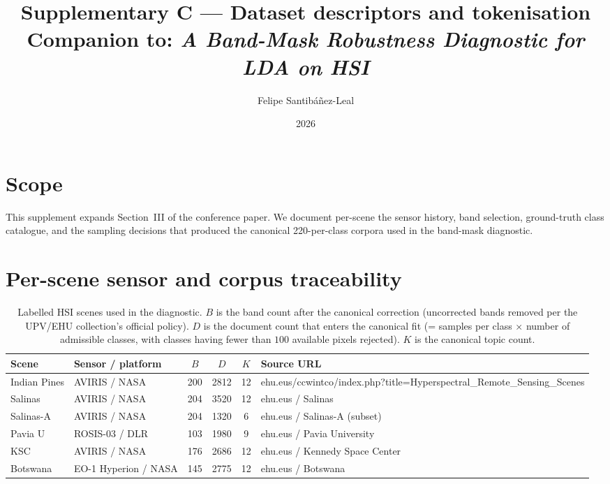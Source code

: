 \documentclass[11pt,a4paper]{article}
\title{Supplementary C --- Dataset descriptors and tokenisation\\
{\large Companion to: \emph{A Band-Mask Robustness Diagnostic for LDA on HSI}}}
\author{Felipe Santib\'a\~nez-Leal}
\date{2026}
\begin{document}
\maketitle

\section{Scope}
This supplement expands Section~III of the conference paper. We
document per-scene the sensor history, band selection, ground-truth
class catalogue, and the sampling decisions that produced the
canonical 220-per-class corpora used in the band-mask diagnostic.

\section{Per-scene sensor and corpus traceability}

\begin{longtable}{l p{2.6cm} c c c p{4.0cm}}
\caption{Labelled HSI scenes used in the diagnostic. $B$ is the band
count after the canonical correction (uncorrected bands removed per
the UPV/EHU collection's official policy). $D$ is the document count
that enters the canonical fit (= samples per class × number of
admissible classes, with classes having fewer than $100$ available
pixels rejected). $K$ is the canonical topic count.}
\label{tab:scenes-full}\\
\toprule
Scene & Sensor / platform & $B$ & $D$ & $K$ & Source URL  \\
\midrule
Indian Pines       & AVIRIS / NASA      & 200 & 2812 & 12 & ehu.eus/ccwintco/index.php?title=Hyperspectral\_Remote\_Sensing\_Scenes \\
Salinas            & AVIRIS / NASA      & 204 & 3520 & 12 & ehu.eus / Salinas \\
Salinas-A          & AVIRIS / NASA      & 204 & 1320 & 6  & ehu.eus / Salinas-A (subset)  \\
Pavia U            & ROSIS-03 / DLR     & 103 & 1980 & 9  & ehu.eus / Pavia University \\
KSC                & AVIRIS / NASA      & 176 & 2686 & 12 & ehu.eus / Kennedy Space Center \\
Botswana           & EO-1 Hyperion / NASA & 145 & 2775 & 12 & ehu.eus / Botswana \\
\bottomrule
\end{longtable}
\end{document}
